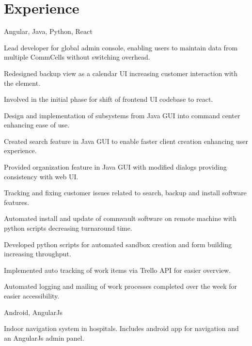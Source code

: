 \documentclass[]{font}
\begin{document}
\begin{minipage}[t]{0.66\textwidth} 


\section{Experience}
Angular, Java, Python, React
\vspace{\topsep}
\begin{tightemize}
\item Lead developer for global admin console, enabling users to maintain data from multiple CommCells without switching overhead. 
\item Redesigned backup view as a calendar UI increasing customer interaction with the element.
\item Involved in the initial phase for shift of frontend UI codebase to react.
\item Design and implementation of subsystems from Java GUI into command center enhancing ease of use.
\item Created search feature in Java GUI to enable faster client creation enhancing user experience.
\item Provided organization feature in Java GUI with modified dialogs providing consistency with web UI.
\item Tracking and fixing customer issues related to search, backup and install software features.
\item Automated install and update of commvault software on remote machine with python scripts decreasing turnaround time.
\item Developed python scripts for automated sandbox creation and form building increasing throughput. 
\item Implemented auto tracking of work items via Trello API for easier overview.
\item Automated logging and mailing of work processes completed over the week for easier accessibility.
\end{tightemize}    
\sectionsep

Android, AngularJs 
\begin{tightemize}
\item Indoor navigation system in hospitals. Includes android app for navigation and an AngularJs admin panel.
\end{tightemize}    
\sectionsep


\end{minipage}
\end{document}
